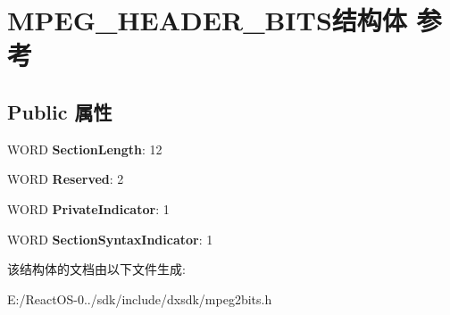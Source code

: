 \hypertarget{struct_m_p_e_g___h_e_a_d_e_r___b_i_t_s}{}\section{M\+P\+E\+G\+\_\+\+H\+E\+A\+D\+E\+R\+\_\+\+B\+I\+T\+S结构体 参考}
\label{struct_m_p_e_g___h_e_a_d_e_r___b_i_t_s}
\subsection*{Public 属性}
\begin{DoxyCompactItemize}
\item 
\mbox{\label{struct_m_p_e_g___h_e_a_d_e_r___b_i_t_s_a271c9f2b971d0a7eac627186f2786029}} 
W\+O\+RD {\bfseries Section\+Length}\+: 12
\item 
\mbox{\label{struct_m_p_e_g___h_e_a_d_e_r___b_i_t_s_a9f234cf9481de794c8c9bead689f7253}} 
W\+O\+RD {\bfseries Reserved}\+: 2
\item 
\mbox{\label{struct_m_p_e_g___h_e_a_d_e_r___b_i_t_s_a0b3523fb6a9afa08c253e038535ed9cf}} 
W\+O\+RD {\bfseries Private\+Indicator}\+: 1
\item 
\mbox{\label{struct_m_p_e_g___h_e_a_d_e_r___b_i_t_s_af2997325833d63efe20712365e541604}} 
W\+O\+RD {\bfseries Section\+Syntax\+Indicator}\+: 1
\end{DoxyCompactItemize}


该结构体的文档由以下文件生成\+:\begin{DoxyCompactItemize}
\item 
E\+:/\+React\+O\+S-\/0../sdk/include/dxsdk/mpeg2bits.\+h\end{DoxyCompactItemize}
